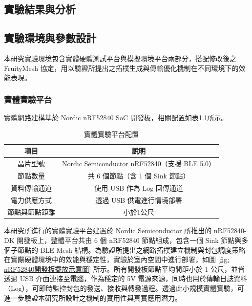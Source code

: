 \begin{ZhChapter}

\chapter{實驗結果與分析}

\section{實驗環境與參數設計}

本研究實驗環境包含實體硬體測試平台與模擬環境平台兩部分，搭配修改後之 FruityMesh 協定，用以驗證所提出之拓樸生成與傳輸優化機制在不同環境下的效能表現。

\subsection{實體實驗平台}
實體網路建構基於 Nordic nRF52840 SoC 開發板，相關配置如表\ref{tab: 實體實驗平台配置}所示。

\begin{table}[H]
\centering
\caption{實體實驗平台配置}
\label{tab: 實體實驗平台配置}
\begin{tabular}{|c|c|}
    \hline
    項目 & 說明 \\ 
    \hline
    晶片型號 & Nordic Semiconductor nRF52840（支援 BLE 5.0） \\
    \hline
    節點數量 & 共 6 個節點（含 1 個 Sink 節點） \\
    \hline
    資料傳輸通道 & 使用 USB 作為 Log 回傳通道 \\
    \hline
    電力供應方式 & 透過 USB 供電進行情境部署 \\
    \hline
    節點與節點距離 & 小於1公尺 \\
    \hline
\end{tabular}
\end{table}

本研究所進行的實體實驗平台建置於 Nordic Semiconductor 所推出的 nRF52840-DK 開發板上，整體平台共由 6 個 nRF52840 節點組成，包含一個 Sink 節點與多個子節點的 BLE Mesh 結構。為驗證所提出之網路拓樸建立機制與封包調度策略在實際硬體環境中的效能與穩定性，實驗於室內空間中進行部署，如圖 \ref{fig: nRF52840開發板擺放示意圖} 所示。所有開發板節點平均間距小於 1 公尺，並皆透過 USB 介面連接至電腦，作為穩定的 5V 電源來源，同時也用於傳輸日誌資料（Log），可即時監控封包的發送、接收與轉發過程。透過此小規模實體實驗，可進一步驗證本研究所設計之機制的實用性與真實應用潛力。



\end{ZhChapter}
